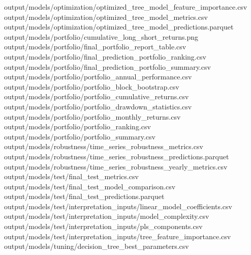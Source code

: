\documentclass[
  11pt,
  a4paper]{article}
\newenvironment{Shaded}{}{}
\newcommand{\NormalTok}[1]{#1}
\begin{document}
\begin{Shaded}
\begin{Highlighting}[]
\NormalTok{output/models/optimization/optimized\_\allowbreak{}tree\_\allowbreak{}model\_\allowbreak{}feature\_\allowbreak{}importance.csv}
\NormalTok{output/models/optimization/optimized\_\allowbreak{}tree\_\allowbreak{}model\_\allowbreak{}metrics.csv}
\NormalTok{output/models/optimization/optimized\_\allowbreak{}tree\_\allowbreak{}model\_\allowbreak{}predictions.parquet}
\NormalTok{output/models/portfolio/cumulative\_\allowbreak{}long\_\allowbreak{}short\_\allowbreak{}returns.png}
\NormalTok{output/models/portfolio/final\_\allowbreak{}portfolio\_\allowbreak{}report\_\allowbreak{}table.csv}
\NormalTok{output/models/portfolio/final\_\allowbreak{}prediction\_\allowbreak{}portfolio\_\allowbreak{}ranking.csv}
\NormalTok{output/models/portfolio/final\_\allowbreak{}prediction\_\allowbreak{}portfolio\_\allowbreak{}summary.csv}
\NormalTok{output/models/portfolio/portfolio\_\allowbreak{}annual\_\allowbreak{}performance.csv}
\NormalTok{output/models/portfolio/portfolio\_\allowbreak{}block\_\allowbreak{}bootstrap.csv}
\NormalTok{output/models/portfolio/portfolio\_\allowbreak{}cumulative\_\allowbreak{}returns.csv}
\NormalTok{output/models/portfolio/portfolio\_\allowbreak{}drawdown\_\allowbreak{}statistics.csv}
\NormalTok{output/models/portfolio/portfolio\_\allowbreak{}monthly\_\allowbreak{}returns.csv}
\NormalTok{output/models/portfolio/portfolio\_\allowbreak{}ranking.csv}
\NormalTok{output/models/portfolio/portfolio\_\allowbreak{}summary.csv}
\NormalTok{output/models/robustness/time\_\allowbreak{}series\_\allowbreak{}robustness\_\allowbreak{}metrics.csv}
\NormalTok{output/models/robustness/time\_\allowbreak{}series\_\allowbreak{}robustness\_\allowbreak{}predictions.parquet}
\NormalTok{output/models/robustness/time\_\allowbreak{}series\_\allowbreak{}robustness\_\allowbreak{}yearly\_\allowbreak{}metrics.csv}
\NormalTok{output/models/test/final\_\allowbreak{}test\_\allowbreak{}metrics.csv}
\NormalTok{output/models/test/final\_\allowbreak{}test\_\allowbreak{}model\_\allowbreak{}comparison.csv}
\NormalTok{output/models/test/final\_\allowbreak{}test\_\allowbreak{}predictions.parquet}
\NormalTok{output/models/test/interpretation\_\allowbreak{}inputs/linear\_\allowbreak{}model\_\allowbreak{}coefficients.csv}
\NormalTok{output/models/test/interpretation\_\allowbreak{}inputs/model\_\allowbreak{}complexity.csv}
\NormalTok{output/models/test/interpretation\_\allowbreak{}inputs/pls\_\allowbreak{}components.csv}
\NormalTok{output/models/test/interpretation\_\allowbreak{}inputs/tree\_\allowbreak{}feature\_\allowbreak{}importance.csv}
\NormalTok{output/models/tuning/decision\_\allowbreak{}tree\_\allowbreak{}best\_\allowbreak{}parameters.csv}

\end{Highlighting}
\end{Shaded}
\end{document}

